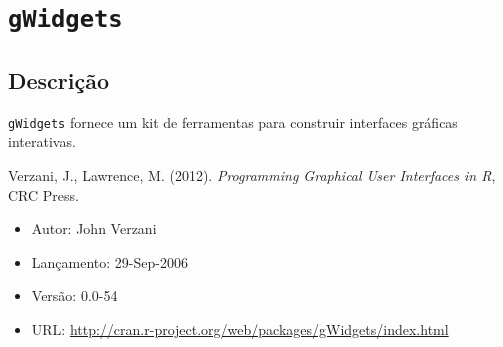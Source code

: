\section{\texttt{gWidgets}}


\subsection*{Descrição}

\begin{frame}

  \texttt{gWidgets} fornece um kit de ferramentas para construir
  interfaces gráficas interativas.

  \vspace{\baselineskip}

  Verzani, J., Lawrence, M. (2012). \emph{Programming Graphical User
    Interfaces in R}, CRC Press.

  \begin{itemize}
  \item Autor: John Verzani
  \item Lançamento: 29-Sep-2006
  \item Versão: 0.0-54
  \item URL: \url{http://cran.r-project.org/web/packages/gWidgets/index.html}
  \end{itemize}

\end{frame}

